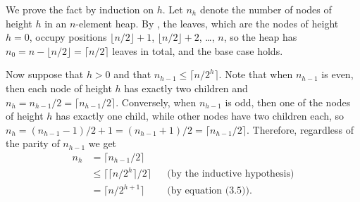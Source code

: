 We prove the fact by induction on $h$.
Let $n_h$ denote the number of nodes of height $h$ in an $n$-element heap.
By , the leaves, which are the nodes of height $h=0$, occupy positions $\lfloor n/2\rfloor+1$, $\lfloor n/2\rfloor+2$, \dots, $n$, so the heap has $n_0=n-\lfloor n/2\rfloor=\lceil n/2\rceil$ leaves in total, and the base case holds.

Now suppose that $h>0$ and that $n_{h-1}\le\bigl\lceil n/2^h\bigr\rceil$.
Note that when $n_{h-1}$ is even, then each node of height $h$ has exactly two children and $n_h=n_{h-1}/2=\lceil n_{h-1}/2\rceil$.
Conversely, when $n_{h-1}$ is odd, then one of the nodes of height $h$ has exactly one child, while other nodes have two children each, so $n_h=(n_{h-1}-1)/2+1=(n_{h-1}+1)/2=\lceil n_{h-1}/2\rceil$.
Therefore, regardless of the parity of $n_{h-1}$ we get
\begin{align*}
    n_h &= \lceil n_{h-1}/2\rceil \\
    &\le \bigl\lceil\bigl\lceil n/2^h\bigr\rceil/2\bigr\rceil && \text{(by the inductive hypothesis)} \\
    &= \bigl\lceil n/2^{h+1}\bigr\rceil && \text{(by equation (3.5))}.
\end{align*}
